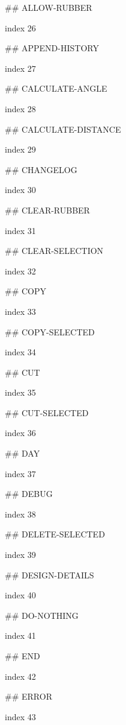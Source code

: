 ## ALLOW-RUBBER

index 26



## APPEND-HISTORY

index 27



## CALCULATE-ANGLE

index 28



## CALCULATE-DISTANCE

index 29



## CHANGELOG

index 30



## CLEAR-RUBBER

index 31



## CLEAR-SELECTION

index 32



## COPY

index 33



## COPY-SELECTED

index 34



## CUT

index 35



## CUT-SELECTED

index 36



## DAY

index 37



## DEBUG

index 38



## DELETE-SELECTED

index 39



## DESIGN-DETAILS

index 40



## DO-NOTHING

index 41



## END

index 42



## ERROR

index 43



